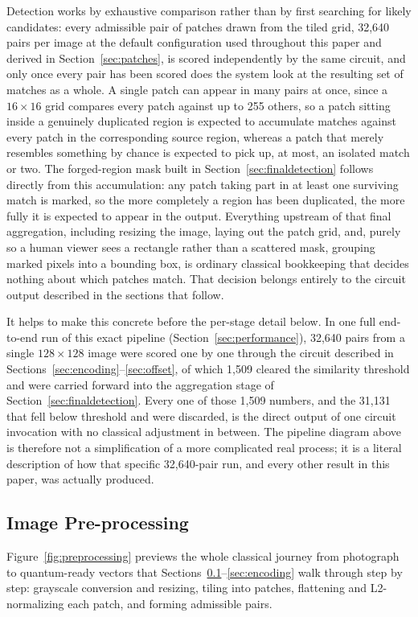 \documentclass[conference]{IEEEtran}
\begin{document}
Detection works by exhaustive comparison rather than by first searching for likely candidates: every admissible pair of patches drawn from the tiled grid, 32,640 pairs per image at the default configuration used throughout this paper and derived in Section~\ref{sec:patches}, is scored independently by the same circuit, and only once every pair has been scored does the system look at the resulting set of matches as a whole. A single patch can appear in many pairs at once, since a $16\times16$ grid compares every patch against up to 255 others, so a patch sitting inside a genuinely duplicated region is expected to accumulate matches against every patch in the corresponding source region, whereas a patch that merely resembles something by chance is expected to pick up, at most, an isolated match or two. The forged-region mask built in Section~\ref{sec:finaldetection} follows directly from this accumulation: any patch taking part in at least one surviving match is marked, so the more completely a region has been duplicated, the more fully it is expected to appear in the output. Everything upstream of that final aggregation, including resizing the image, laying out the patch grid, and, purely so a human viewer sees a rectangle rather than a scattered mask, grouping marked pixels into a bounding box, is ordinary classical bookkeeping that decides nothing about which patches match. That decision belongs entirely to the circuit output described in the sections that follow.

It helps to make this concrete before the per-stage detail below. In one full end-to-end run of this exact pipeline (Section~\ref{sec:performance}), 32,640 pairs from a single $128\times128$ image were scored one by one through the circuit described in Sections~\ref{sec:encoding}--\ref{sec:offset}, of which 1,509 cleared the similarity threshold and were carried forward into the aggregation stage of Section~\ref{sec:finaldetection}. Every one of those 1,509 numbers, and the 31,131 that fell below threshold and were discarded, is the direct output of one circuit invocation with no classical adjustment in between. The pipeline diagram above is therefore not a simplification of a more complicated real process; it is a literal description of how that specific 32,640-pair run, and every other result in this paper, was actually produced.

\subsection{Image Pre-processing}\label{sec:preprocessing}
Figure~\ref{fig:preprocessing} previews the whole classical journey from photograph to quantum-ready vectors that Sections~\ref{sec:preprocessing}--\ref{sec:encoding} walk through step by step: grayscale conversion and resizing, tiling into patches, flattening and L2-normalizing each patch, and forming admissible pairs.
\end{document}
